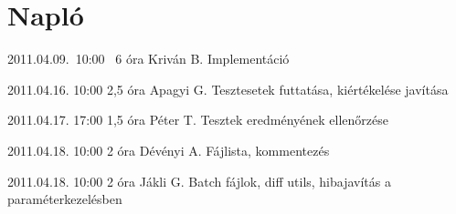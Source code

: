 %
\section{Napló}

\begin{naplo}

\bejegyzes
{2011.04.09.~10:00~} %
{6 óra} %
{Kriván B.} %
{Implementáció} %

\bejegyzes
{2011.04.16. 10:00} %
{2,5 óra} %
{Apagyi G.} %
{Tesztesetek futtatása, kiértékelése javítása} %

\bejegyzes
{2011.04.17. 17:00} %
{1,5 óra} %
{Péter T.} %
{Tesztek eredményének ellenőrzése} %

\bejegyzes
{2011.04.18. 10:00} %
{2 óra} %
{Dévényi A.} %
{Fájlista, kommentezés} %

\bejegyzes
{2011.04.18. 10:00} %
{2 óra} %
{Jákli G.} %
{Batch fájlok, diff utils, hibajavítás a paraméterkezelésben} %


\end{naplo}

